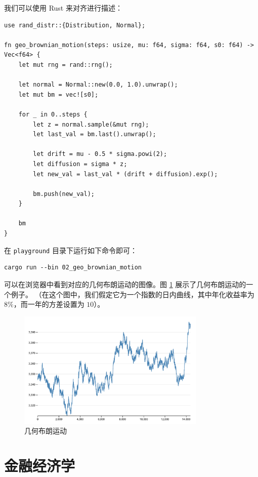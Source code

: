 \documentclass[utf8,a4paper,nofonts]{ctexbook}
\begin{document}
我们可以使用 Rust 来对齐进行描述：

\begin{lstlisting}
use rand_distr::{Distribution, Normal};

fn geo_brownian_motion(steps: usize, mu: f64, sigma: f64, s0: f64) -> Vec<f64> {
    let mut rng = rand::rng();

    let normal = Normal::new(0.0, 1.0).unwrap();
    let mut bm = vec![s0];

    for _ in 0..steps {
        let z = normal.sample(&mut rng);
        let last_val = bm.last().unwrap();

        let drift = mu - 0.5 * sigma.powi(2);
        let diffusion = sigma * z;
        let new_val = last_val * (drift + diffusion).exp();

        bm.push(new_val);
    }

    bm
}
\end{lstlisting}

在 \verb|playground| 目录下运行如下命令即可：

\begin{lstlisting}
cargo run --bin 02_geo_brownian_motion
\end{lstlisting}

可以在浏览器中看到对应的几何布朗运动的图像。图 \ref{fig:geoBrownianMotion} 展示了几何布朗运动的一个例子。
（在这个图中，我们假定它为一个指数的日内曲线，其中年化收益率为 $8\%$，而一年的方差设置为 $10$）。

\begin{figure}[h]
    \centering
    \includegraphics[width=0.8\textwidth]{src/static/01_geo_brownian_motion.png}
    \caption{几何布朗运动}
    \label{fig:geoBrownianMotion}
\end{figure}

\chapter{金融经济学}
\end{document}
